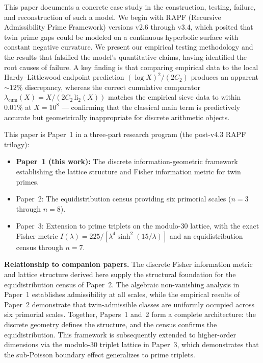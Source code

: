 \documentclass[11pt]{article}
\begin{document}
This paper documents a concrete case study in the construction, testing, failure, and reconstruction of such a model. We begin with RAPF (Recursive Admissibility Prime Framework) versions v2.6 through v3.4, which posited that twin prime gaps could be modeled on a continuous hyperbolic surface with constant negative curvature. We present our empirical testing methodology and the results that falsified the model's quantitative claims, having identified the root causes of failure. A key finding is that comparing empirical data to the local Hardy--Littlewood endpoint prediction $(\log X)^2/(2C_2)$ produces an apparent $\sim 12\%$ discrepancy, whereas the correct cumulative comparator $\lambda_{\mathrm{cum}}(X) = X/(2C_2\,\mathrm{li}_2(X))$ matches the empirical sieve data to within $0.01\%$ at $X = 10^8$ --- confirming that the classical main term is predictively accurate but geometrically inappropriate for discrete arithmetic objects.

This paper is Paper~1 in a three-part research program (the post-v4.3 RAPF trilogy):
\begin{itemize}
  \item \textbf{Paper~1 (this work):} The discrete information-geometric framework establishing the lattice structure and Fisher information metric for twin primes.
  \item Paper~2: The equidistribution census providing six primorial scales ($n=3$ through $n=8$).
  \item Paper~3: Extension to prime triplets on the modulo-30 lattice, with the exact Fisher metric $I(\lambda) = 225/[\lambda^4 \sinh^2(15/\lambda)]$ and an equidistribution census through $n=7$.
\end{itemize}

\noindent\textbf{Relationship to companion papers.} The discrete Fisher information metric and lattice structure derived here supply the structural foundation for the equidistribution census of Paper~2. The algebraic non-vanishing analysis in Paper~1 establishes admissibility at all scales, while the empirical results of Paper~2 demonstrate that twin-admissible classes are uniformly occupied across six primorial scales. Together, Papers~1 and~2 form a complete architecture: the discrete geometry defines the structure, and the census confirms the equidistribution. This framework is subsequently extended to higher-order dimensions via the modulo-30 triplet lattice in Paper~3, which demonstrates that the sub-Poisson boundary effect generalizes to prime triplets.
\end{document}
